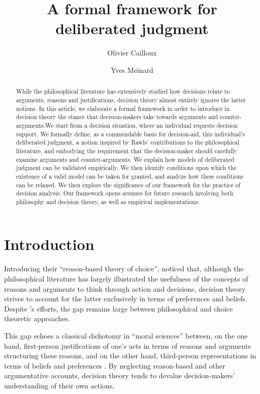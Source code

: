 \documentclass[version=3.21, pagesize, twoside=off, bibliography=totoc, DIV=calc, fontsize=12pt, a4paper]{scrartcl}
\title{A formal framework for deliberated judgment}
\author{Olivier Cailloux}
\author{Yves Meinard}
\affil{Université Paris-Dauphine, PSL Research University, CNRS, LAMSADE, 75016 PARIS, FRANCE\\
	\href{mailto:olivier.cailloux@dauphine.fr}{olivier.cailloux@dauphine.fr}
}
\begin{document}
\maketitle

\begin{abstract}
While the philosophical literature has extensively studied how decisions relate to arguments, reasons and justifications, decision theory almost entirely ignores the latter notions.
In this article, we elaborate a formal framework in order to introduce in decision theory the stance that decision-makers take towards arguments and counter-arguments.We start from a decision situation, where an individual requests decision support. We formally define, as a commendable basis for decision-aid, this individual’s deliberated judgment, a notion inspired by Rawls' contributions to the philosophical literature, and embodying the requirement that the decision-maker should carefully examine arguments and counter-arguments.  
We explain how models of deliberated judgment can be validated empirically.
We then identify conditions upon which the existence of a valid model can be taken for granted, and analyze how these conditions can be relaxed.
We then explore the significance of our framework for the practice of decision analysis.
Our framework opens avenues for future research involving both philosophy and decision theory, as well as empirical implementations. 
\end{abstract}

\section{Introduction}
\label{sec:intro}

Introducing their “reason-based theory of choice”, \citet{dietrich_reason-based_2013} noticed that, although the philosophical literature has largely illustrated the usefulness of the concepts of reasons and arguments to think through action and decisions, decision theory strives to account for the latter exclusively in terms of preferences and beliefs. Despite \citeauthor{dietrich_reason-based_2013}’s \citeyearpar{dietrich_reason-based_2013, dietrich_reason-based_2016} efforts, the gap remains large between philosophical and choice theoretic approaches.

This gap echoes a classical dichotomy in “moral sciences” between, on the one hand, first-person justifications of one's acts in terms of reasons and arguments structuring these reasons, and on the other hand, third-person representations in terms of beliefs and preferences \citep{hausman_preference_2011}. By neglecting reason-based and other argumentative accounts, decision theory tends to devalue decision-makers' understanding of their own actions.
\end{document}

